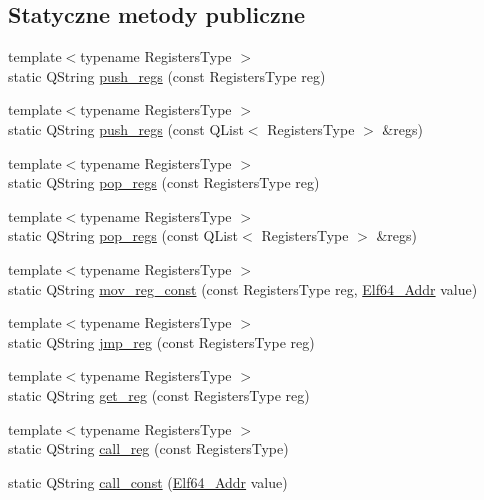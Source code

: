 \subsection*{Statyczne metody publiczne}
\begin{DoxyCompactItemize}
\item 
{\footnotesize template$<$typename Registers\-Type $>$ }\\static Q\-String \hyperlink{class_asm_code_generator_a76f8c73f9210eb61a8001c017c0cd4f1}{push\-\_\-regs} (const Registers\-Type reg)
\item 
{\footnotesize template$<$typename Registers\-Type $>$ }\\static Q\-String \hyperlink{class_asm_code_generator_a25ee0b50bb215502d9b61a753086f184}{push\-\_\-regs} (const Q\-List$<$ Registers\-Type $>$ \&regs)
\item 
{\footnotesize template$<$typename Registers\-Type $>$ }\\static Q\-String \hyperlink{class_asm_code_generator_a75bbaa5a9453e6997afdfa14e9471362}{pop\-\_\-regs} (const Registers\-Type reg)
\item 
{\footnotesize template$<$typename Registers\-Type $>$ }\\static Q\-String \hyperlink{class_asm_code_generator_aaed0677c22b8a46586286483ed11f205}{pop\-\_\-regs} (const Q\-List$<$ Registers\-Type $>$ \&regs)
\item 
{\footnotesize template$<$typename Registers\-Type $>$ }\\static Q\-String \hyperlink{class_asm_code_generator_a955d06de335abb5491727e690bb4cc85}{mov\-\_\-reg\-\_\-const} (const Registers\-Type reg, \hyperlink{elf_8h_aeed51d08e3a950d637f8ec1f0cd4ef65}{Elf64\-\_\-\-Addr} value)
\item 
{\footnotesize template$<$typename Registers\-Type $>$ }\\static Q\-String \hyperlink{class_asm_code_generator_ac196b01980e9de00bf6854baed99a1a2}{jmp\-\_\-reg} (const Registers\-Type reg)
\item 
{\footnotesize template$<$typename Registers\-Type $>$ }\\static Q\-String \hyperlink{class_asm_code_generator_ab578154f2a3d0ef023c8f6a302a3f565}{get\-\_\-reg} (const Registers\-Type reg)
\item 
{\footnotesize template$<$typename Registers\-Type $>$ }\\static Q\-String \hyperlink{class_asm_code_generator_a3bf9daed908df41eeec6031db9de2aae}{call\-\_\-reg} (const Registers\-Type)
\item 
static Q\-String \hyperlink{class_asm_code_generator_aa4989922344c4dc9ccfa937508915c3d}{call\-\_\-const} (\hyperlink{elf_8h_aeed51d08e3a950d637f8ec1f0cd4ef65}{Elf64\-\_\-\-Addr} value)
\end{DoxyCompactItemize}


